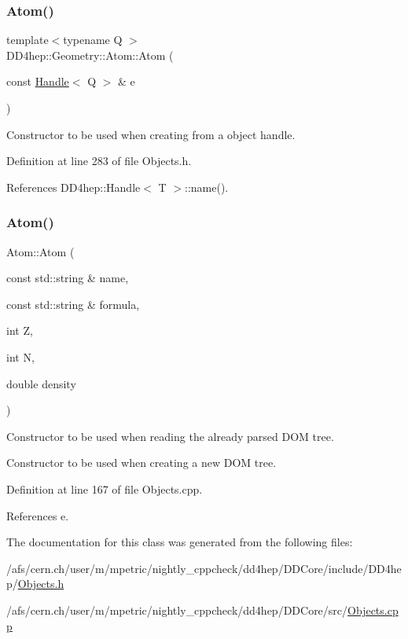 \subsubsection{\texorpdfstring{Atom()}{Atom()}\hspace{0.1cm}{\footnotesize\ttfamily [3/4]}}
{\footnotesize\ttfamily template$<$typename Q $>$ \\
D\+D4hep\+::\+Geometry\+::\+Atom\+::\+Atom (\begin{DoxyParamCaption}\item[{const \hyperlink{class_d_d4hep_1_1_handle}{Handle}$<$ Q $>$ \&}]{e }\end{DoxyParamCaption})\hspace{0.3cm}{\ttfamily [inline]}}



Constructor to be used when creating from a object handle. 



Definition at line 283 of file Objects.\+h.



References D\+D4hep\+::\+Handle$<$ T $>$\+::name().

\hypertarget{class_d_d4hep_1_1_geometry_1_1_atom_a3aa765b836dee92a2cfab6dfce0164df}{}\label{class_d_d4hep_1_1_geometry_1_1_atom_a3aa765b836dee92a2cfab6dfce0164df} 
\subsubsection{\texorpdfstring{Atom()}{Atom()}\hspace{0.1cm}{\footnotesize\ttfamily [4/4]}}
{\footnotesize\ttfamily Atom\+::\+Atom (\begin{DoxyParamCaption}\item[{const std\+::string \&}]{name,  }\item[{const std\+::string \&}]{formula,  }\item[{int}]{Z,  }\item[{int}]{N,  }\item[{double}]{density }\end{DoxyParamCaption})}



Constructor to be used when reading the already parsed D\+OM tree. 

Constructor to be used when creating a new D\+OM tree. 

Definition at line 167 of file Objects.\+cpp.



References e.



The documentation for this class was generated from the following files\+:\begin{DoxyCompactItemize}
\item 
/afs/cern.\+ch/user/m/mpetric/nightly\+\_\+cppcheck/dd4hep/\+D\+D\+Core/include/\+D\+D4hep/\hyperlink{_objects_8h}{Objects.\+h}\item 
/afs/cern.\+ch/user/m/mpetric/nightly\+\_\+cppcheck/dd4hep/\+D\+D\+Core/src/\hyperlink{_objects_8cpp}{Objects.\+cpp}\end{DoxyCompactItemize}
